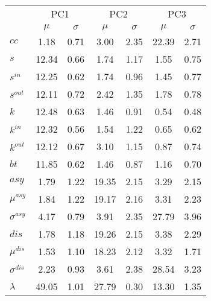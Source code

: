 \begin{center}
\begin{tabular}{| l | c | c | c | c | c | c |}\cline{2-7}
\multicolumn{1}{c|}{} & \multicolumn{2}{c|}{PC1}          & \multicolumn{2}{c|}{PC2} & \multicolumn{2}{c|}{PC3}  \\\cline{2-7}\multicolumn{1}{c|}{} & $\mu$            & $\sigma$ & $\mu$         & $\sigma$ & $\mu$ & $\sigma$  \\\hline
$cc$ & 1.18  & 0.71  & 3.00  & 2.35  & 22.39  & 2.71 \\\hline
$s$ & 12.34  & 0.66  & 1.74  & 1.17  & 1.55  & 0.75 \\
$s^{in}$ & 12.25  & 0.62  & 1.74  & 0.96  & 1.45  & 0.77 \\
$s^{out}$ & 12.11  & 0.72  & 2.42  & 1.35  & 1.78  & 0.78 \\
$k$ & 12.48  & 0.63  & 1.46  & 0.91  & 0.54  & 0.48 \\
$k^{in}$ & 12.32  & 0.56  & 1.54  & 1.22  & 0.65  & 0.62 \\
$k^{out}$ & 12.12  & 0.67  & 3.10  & 1.15  & 0.87  & 0.74 \\
$bt$ & 11.85  & 0.62  & 1.46  & 0.87  & 1.16  & 0.70 \\\hline
$asy$ & 1.79  & 1.22  & 19.35  & 2.15  & 3.29  & 2.15 \\
$\mu^{asy}$ & 1.84  & 1.22  & 19.17  & 2.16  & 3.31  & 2.23 \\
$\sigma^{asy}$ & 4.17  & 0.79  & 3.91  & 2.35  & 27.79  & 3.96 \\
$dis$ & 1.78  & 1.18  & 19.26  & 2.15  & 3.38  & 2.29 \\
$\mu^{dis}$ & 1.53  & 1.10  & 18.23  & 2.12  & 3.32  & 1.71 \\
$\sigma^{dis}$ & 2.23  & 0.93  & 3.61  & 2.38  & 28.54  & 3.23 \\
$\lambda$ & 49.05  & 1.01  & 27.79  & 0.30  & 13.30  & 1.35 \\
\hline\end{tabular}
\end{center}